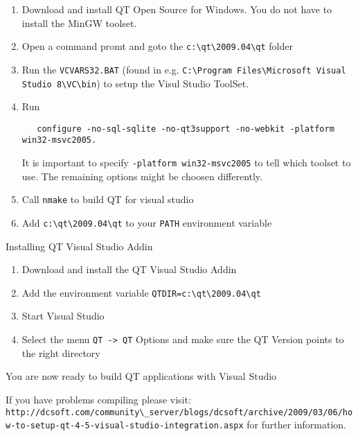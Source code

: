 \begin{enumerate}
\item Download and install QT Open Source for Windows. You do not have to install the MinGW toolset.
\item Open a command promt and goto the \lstinline{c:\qt\2009.04\qt} folder
\item Run the \lstinline{VCVARS32.BAT} (found in e.g. \lstinline{C:\Program Files\Microsoft Visual Studio 8\VC\bin}) to setup the Visul Studio ToolSet.
\item Run 
\begin{lstlisting}
   configure -no-sql-sqlite -no-qt3support -no-webkit -platform win32-msvc2005. 
\end{lstlisting}   

It is important to specify \lstinline{-platform win32-msvc2005} to tell which toolset to use. The remaining options might be choosen differently.
\item Call \lstinline{nmake} to build QT for visual studio
\item Add \lstinline{c:\qt\2009.04\qt} to your \lstinline{PATH} environment variable
\end{enumerate}
 
Installing QT Visual Studio Addin

\begin{enumerate}
\item Download and install the QT Visual Studio Addin
\item Add the environment variable \lstinline{QTDIR=c:\qt\2009.04\qt}
\item Start Visual Studio
\item Select the menu \lstinline{QT -> QT} Options and make sure the QT Version points to the right directory
\end{enumerate}

You are now ready to build QT applications with Visual Studio

If you have problems compiling please visit: \lstinline{http://dcsoft.com/community\_server/blogs/dcsoft/archive/2009/03/06/how-to-setup-qt-4-5-visual-studio-integration.aspx}
for further information.